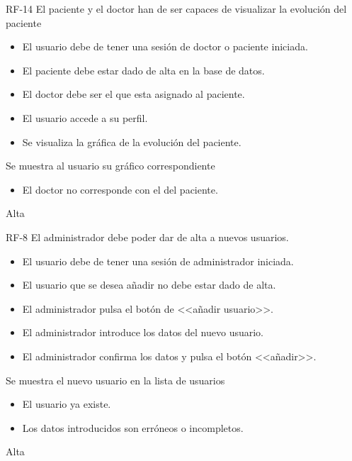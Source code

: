 {RF-14}
{El paciente y el doctor han de ser capaces de visualizar la evolución del paciente}
{	\begin{itemize}
	\def\labelenumi{\arabic{enumi}.}
	\tightlist
	\item El usuario debe de tener una sesión de doctor o paciente iniciada.
	\item El paciente debe estar dado de alta en la base de datos.
	\item El doctor debe ser el que esta asignado al paciente.
	\end{itemize}}
{
	\begin{itemize}
	\def\labelenumi{\arabic{enumi}.}
	\tightlist

    \item El usuario accede a su perfil.
    \item Se visualiza la gráfica de la evolución del paciente.
    \end{itemize}
}
{Se muestra al usuario su gráfico correspondiente}
{\begin{itemize}
	\def\labelenumi{\arabic{enumi}.}
	\tightlist
	\item El doctor no corresponde con el del paciente.
	\end{itemize}}
{Alta}

{RF-8}
{El administrador debe poder dar de alta a nuevos usuarios.}
{	\begin{itemize}
	\def\labelenumi{\arabic{enumi}.}
	\tightlist
	\item El usuario debe de tener una sesión de administrador iniciada.
	\item El usuario que se desea añadir no debe estar dado de alta.
	\end{itemize}}
{
	\begin{itemize}
	\def\labelenumi{\arabic{enumi}.}
	\tightlist

    \item El administrador pulsa el botón de <<añadir usuario>>.
    \item El administrador introduce los datos del nuevo usuario.
    \item El administrador confirma los datos y pulsa el botón <<añadir>>.
    \end{itemize}
}
{Se muestra el nuevo usuario en la lista de usuarios}
{\begin{itemize}
	\def\labelenumi{\arabic{enumi}.}
	\tightlist
    \item El usuario ya existe.
    \item Los datos introducidos son erróneos o incompletos.
    \end{itemize}}
{Alta}

